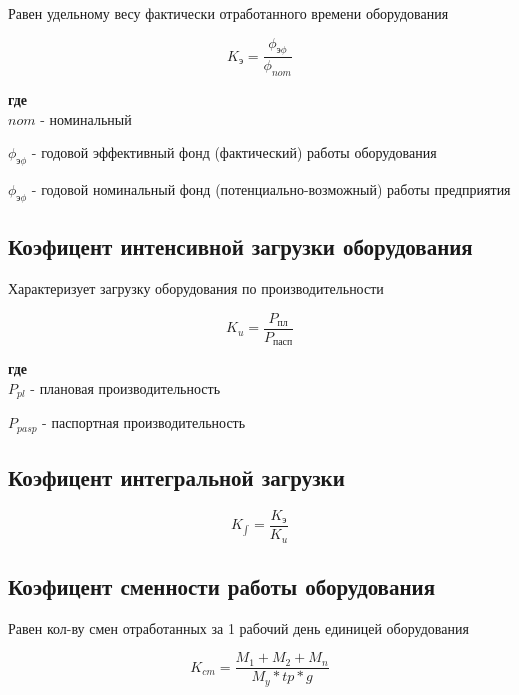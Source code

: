 \documentclass[11pt]{article}
\begin{document}
Равен удельному весу фактически отработанного времени оборудования

\begin{equation}
  K_{\text{э}} = \frac{\phi_{\text{э}\phi}}{\phi_{nom}}
\end{equation}

\textbf{где} \\[0pt]

\(nom\) - номинальный


\(\phi_{\text{э}\phi}\) - годовой эффективный фонд (фактический) работы оборудования


\(\phi_{\text{э}\phi}\) - годовой номинальный фонд (потенциально-возможный) работы предприятия


\subsection{Коэфицент интенсивной загрузки оборудования}
\label{sec:org8a71fb4}

Характеризует загрузку оборудования по производительности

\begin{equation}
  K_{u} = \frac{P_{\text{пл}}}{P_{\text{пасп}}}
\end{equation}

\textbf{где} \\[0pt]

\({P_{pl}}\) - плановая производительность

\({P_{pasp}}\) - паспортная производительность

\subsection{Коэфицент интегральной загрузки}
\label{sec:org610f28d}

\begin{equation}
  K_{\int} = \frac{K_{\text{э}}}{K_{u}}
\end{equation}

\subsection{Коэфицент сменности работы оборудования}
\label{sec:org0e70409}

Равен кол-ву смен отработанных за 1 рабочий день единицей оборудования

\begin{equation}
  K_{cm} = \frac{M_{1} + M_{2} + M_{n}}{M_{y}*tp*g}
\end{equation}
\end{document}
